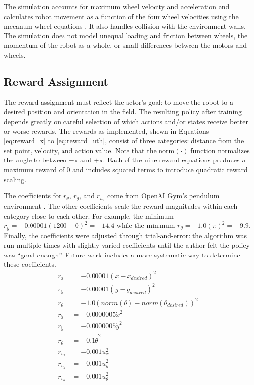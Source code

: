 The simulation accounts for maximum wheel velocity and acceleration and calculates robot movement as a function of the four wheel velocities using the mecanum wheel equations \cite{li_2018}\cite{rahman_2014}. It also handles collision with the environment walls. The simulation does not model unequal loading and friction between wheels, the momentum of the robot as a whole, or small differences between the motors and wheels.

\subsection{Reward Assignment}
The reward assignment must reflect the actor's goal: to move the robot to a desired position and orientation in the field. The resulting policy after training depends greatly on careful selection of which actions and/or states receive better or worse rewards. The rewards as implemented, shown in Equations \ref{eq:reward_x} to \ref{eq:reward_uth}, consist of three categories: distance from the set point, velocity, and action value. Note that the $\text{norm}(\cdot)$ function normalizes the angle to between $-\pi$ and $+\pi$. Each of the nine reward equations produces a maximum reward of 0 and includes squared terms to introduce quadratic reward scaling.

The coefficients for $r_\theta$, $r_{\dot{\theta}}$, and $r_{u_\theta}$ come from OpenAI Gym's pendulum environment \cite{openai_pendulum}. The other coefficients scale the reward magnitudes within each category close to each other. For example, the minimum $r_{y} = -0.00001 (1200 - 0)^2 = -14.4$ while the minimum $r_{\theta} = -1.0 (\pi)^2 = -9.9$. Finally, the coefficients were adjusted through trial-and-error: the algorithm was run multiple times with slightly varied coefficients until the author felt the policy was ``good enough''. Future work includes a more systematic way to determine these coefficients.
\begin{align}
r_x &= -0.00001 (x-x_{desired})^2 \label{eq:reward_x}\\
r_y &= -0.00001 (y-y_{desired})^2 \\
r_\theta &= -1.0 (norm(\theta)-norm(\theta_{desired}))^2 \\
r_{\dot{x}} &= -0.0000005 \dot{x}^2 \\
r_{\dot{y}} &= -0.0000005 \dot{y}^2 \\
r_{\dot{\theta}} &= -0.1 \dot{\theta}^2 \\
r_{u_x} &= -0.001u_x^2 \\
r_{u_y} &= -0.001u_y^2 \\
r_{u_\theta} &= -0.001u_\theta^2 \label{eq:reward_uth}
\end{align}

